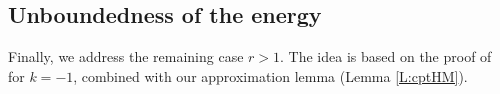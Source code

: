 \documentclass{amsart}
\numberwithin{equation}{section}
\newtheorem{corollary}[theorem]{Corollary}
\theoremstyle{definition}
\theoremstyle{remark}
\newcommand{\bn}{{\mathbf{n}}}
\def\comm#1{{\color{red} #1}}
\begin{document}




\subsection{Unboundedness of the energy}

Finally, we address the remaining case $r>1$.
The idea is based on the proof of \cite[Theorem 2]{MR4630481} for $k=-1$, combined with our approximation lemma (Lemma \ref{L:cptHM}).
\end{document}
